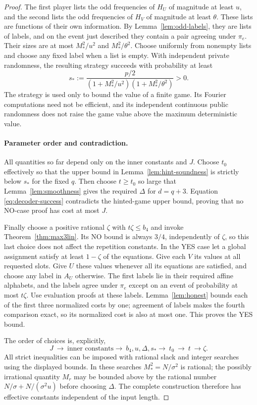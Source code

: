 \begin{proof}
The first player lists the odd frequencies of $H_U$ of magnitude at least
$u$, and the second lists the odd frequencies of $H_V$ of magnitude at least
$\theta$. These lists are functions of their own information. By
Lemma~\ref{lem:odd-labels}, they are lists of labels, and on the event just
described they contain a pair agreeing under $\pi_e$. Their sizes are at
most $M_*^2/u^2$ and $M_*^2/\theta^2$. Choose uniformly from nonempty lists
and choose any fixed label when a list is empty. With independent private
randomness, the resulting strategy succeeds with probability at least
\begin{equation}\label{eq:decoder-success}
 s_*:=\frac{p/2}{(1+M_*^2/u^2)(1+M_*^2/\theta^2)}>0.
\end{equation}
The strategy is used only to bound the value of a finite game. Its Fourier
computations need not be efficient, and its independent continuous public
randomness does not raise the game value above the maximum deterministic
value.

\paragraph{Parameter order and contradiction.}
All quantities so far depend only on the inner constants and $J$.
Choose $t_0$ effectively so that the upper bound in
Lemma~\ref{lem:hint-soundness} is strictly below $s_*$ for the fixed $q$.
Then choose $t\ge t_0$ so large that Lemma~\ref{lem:smoothness} gives the
required $\Delta$ for $d=q+3$. Equation \eqref{eq:decoder-success}
contradicts the hinted-game upper bound, proving that no NO-case proof has
cost at most $J$.

Finally choose a positive rational $\zeta$ with $t\zeta\le b_4$ and invoke
Theorem~\ref{thm:max3lin}. Its NO bound is always $3/4$, independently of
$\zeta$, so this last choice does not affect the repetition constants.
In the YES case let a global assignment satisfy at least $1-\zeta$ of the
equations. Give each $V$ its values at all requested slots. Give $U$ these
values whenever all its equations are satisfied, and choose any label in
$A_U$ otherwise. The first labels lie in their required affine alphabets,
and the labels agree under $\pi_e$ except on an event of probability at most
$t\zeta$. Use evaluation proofs at these labels. Lemma~\ref{lem:honest}
bounds each of the first three normalized costs by one; agreement of labels
makes the fourth comparison exact, so its normalized cost is also at most
one. This proves the YES bound.

The order of choices is, explicitly,
\[
 J\ \longrightarrow\ \text{inner constants}
 \longrightarrow\ b_4,u,\Delta,s_*
 \longrightarrow\ t_0\ \longrightarrow\ t\ \longrightarrow\zeta.
\]
All strict inequalities can be imposed with rational slack and integer
searches using the displayed bounds. In these searches $M_*^2=N/\sigma^2$
is rational; the possibly irrational quantity $M_r$ may be bounded above
by the rational number $N/\sigma+N/(\sigma^2u)$ before choosing $\Delta$. The complete construction therefore
has effective constants independent of the input length.
\end{proof}
